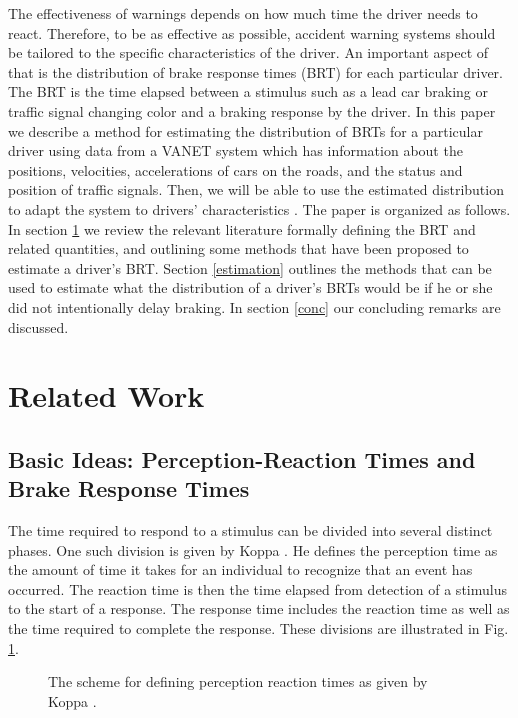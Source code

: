 \documentclass[conference]{IEEEtran}
\begin{document}
The effectiveness of warnings depends on how much time the driver needs to react. Therefore, to be as effective as possible, accident warning systems should be tailored to the specific characteristics of the driver.  An important aspect of that is the distribution of brake response times (BRT) for each particular driver.  The BRT is the time elapsed between a stimulus such as a lead car braking or traffic signal changing color and a braking response by the driver. In this paper we describe a method for estimating the distribution of BRTs for a particular driver using data from a VANET system which has information about the positions, velocities, accelerations of cars on the roads, and the status and position of traffic signals. Then, we will be able to use the estimated distribution to adapt the system to drivers' characteristics \cite{Tunning}. The paper is organized as follows.  In section \ref{section:Related Work} we review the relevant literature formally defining the BRT and related quantities, and outlining some methods that have been proposed to estimate a driver's BRT.
Section \ref{estimation} outlines the methods that can be used to estimate what the distribution of a driver's BRTs would be if he or she did not intentionally delay braking.  In section \ref{conc} our concluding remarks are discussed.

\section{Related Work}\label{section:Related Work}
\subsection{Basic Ideas: Perception-Reaction Times and Brake Response Times}

The time required to respond to a stimulus can be divided into several distinct phases.  One such division is given by Koppa \cite{Koppa:HumanFactors}.  He defines the perception time as the amount of time it takes for an individual to recognize that an event has occurred.  The reaction time is then the time elapsed from detection of a stimulus to the start of a response.  The response time includes the reaction time as well as the time required to complete the response.  These divisions are illustrated in Fig. \ref{fig:KoppaPRTIllustration}.
\begin{figure}[!t]
	\centering
{}
		
	\caption{The scheme for defining perception reaction times as given by Koppa \cite{Koppa:HumanFactors}.}
	\label{fig:KoppaPRTIllustration}
\end{figure}
\end{document}
